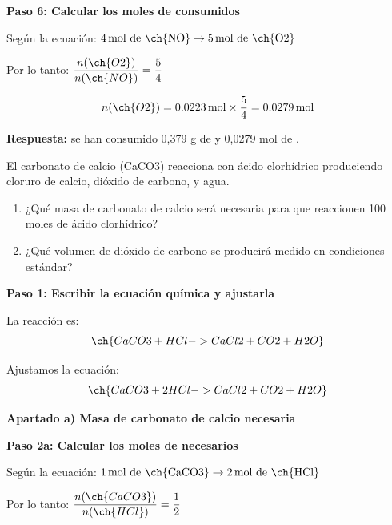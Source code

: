 \begin{exercise}
\begin{solu}
        \textbf{Paso 6: Calcular los moles de  consumidos}

        Según la ecuación: $4\,\text{mol de \ch{NO}} \rightarrow 5\,\text{mol de \ch{O2}}$

        Por lo tanto: $\dfrac{n(\ch{O2})}{n(\ch{NO})} = \dfrac{5}{4}$

        \begin{equation*}
            n(\ch{O2}) = 0.0223\,\text{mol} \times \frac{5}{4} = 0.0279\,\text{mol}
        \end{equation*}

        \textbf{Respuesta:} se han consumido 0,379 g de  y 0,0279 mol de .
    \end{solu}
\end{exercise}

\begin{exercise}
    El carbonato de calcio (CaCO3) reacciona con ácido clorhídrico produciendo cloruro
    de calcio, dióxido de carbono, y agua.
    \begin{enumerate}[label=\letraminuscula]
    \item
    ¿Qué masa de carbonato de calcio será necesaria para que reaccionen 100 moles de
    ácido clorhídrico?
    \item
    ¿Qué volumen de dióxido de carbono se producirá medido en condiciones estándar?
    \end{enumerate}
    \begin{solu}
        \textbf{Paso 1: Escribir la ecuación química y ajustarla}

        La reacción es:
        \begin{equation*}
            \ch{CaCO3 + HCl -> CaCl2 + CO2 + H2O}
        \end{equation*}

        Ajustamos la ecuación:
        \begin{equation*}
            \ch{CaCO3 + 2 HCl -> CaCl2 + CO2 + H2O}
        \end{equation*}

        \textbf{Apartado a) Masa de carbonato de calcio necesaria}

        \textbf{Paso 2a: Calcular los moles de  necesarios}

        Según la ecuación: $1\,\text{mol de \ch{CaCO3}} \rightarrow 2\,\text{mol de \ch{HCl}}$

        Por lo tanto: $\dfrac{n(\ch{CaCO3})}{n(\ch{HCl})} = \dfrac{1}{2}$


\end{solu}
\end{exercise}
